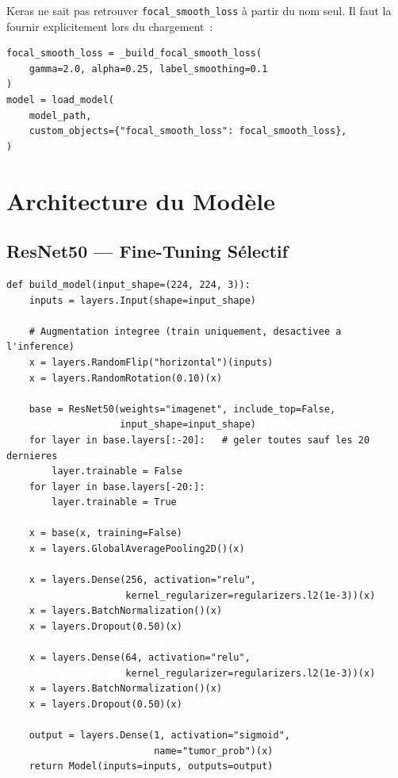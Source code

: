 \documentclass[12pt, a4paper]{report}
\newcommand{\code}[1]{\texttt{\small #1}}
\begin{document}
\begin{infobox}
  Keras ne sait pas retrouver \code{focal\_smooth\_loss} à partir du
  nom seul. Il faut la fournir explicitement lors du chargement~:
\begin{lstlisting}
focal_smooth_loss = _build_focal_smooth_loss(
    gamma=2.0, alpha=0.25, label_smoothing=0.1
)
model = load_model(
    model_path,
    custom_objects={"focal_smooth_loss": focal_smooth_loss},
)
\end{lstlisting}
\end{infobox}

\section{Architecture du Modèle}
\label{sec:archi}

\subsection{ResNet50 — Fine-Tuning Sélectif}

\begin{lstlisting}[caption={Construction du modèle ResNet50 (brats\_classifier.py)},
                   label={lst:model}]
def build_model(input_shape=(224, 224, 3)):
    inputs = layers.Input(shape=input_shape)

    # Augmentation integree (train uniquement, desactivee a l'inference)
    x = layers.RandomFlip("horizontal")(inputs)
    x = layers.RandomRotation(0.10)(x)

    base = ResNet50(weights="imagenet", include_top=False,
                    input_shape=input_shape)
    for layer in base.layers[:-20]:   # geler toutes sauf les 20 dernieres
        layer.trainable = False
    for layer in base.layers[-20:]:
        layer.trainable = True

    x = base(x, training=False)
    x = layers.GlobalAveragePooling2D()(x)

    x = layers.Dense(256, activation="relu",
                     kernel_regularizer=regularizers.l2(1e-3))(x)
    x = layers.BatchNormalization()(x)
    x = layers.Dropout(0.50)(x)

    x = layers.Dense(64, activation="relu",
                     kernel_regularizer=regularizers.l2(1e-3))(x)
    x = layers.BatchNormalization()(x)
    x = layers.Dropout(0.50)(x)

    output = layers.Dense(1, activation="sigmoid",
                          name="tumor_prob")(x)
    return Model(inputs=inputs, outputs=output)
\end{lstlisting}
\end{document}
